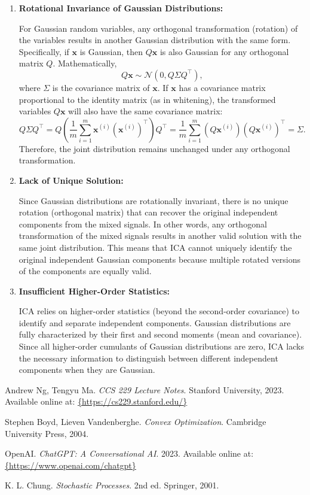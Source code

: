 \documentclass[12pt]{article}
\begin{document}
\begin{enumerate}
    \item \textbf{Rotational Invariance of Gaussian Distributions:}
    
    For Gaussian random variables, any orthogonal transformation (rotation) of the variables results in another Gaussian distribution with the same form. Specifically, if \( \mathbf{x} \) is Gaussian, then \( Q \mathbf{x} \) is also Gaussian for any orthogonal matrix \( Q \). Mathematically,
    \[
    Q \mathbf{x} \sim \mathcal{N}(0, Q \Sigma Q^\top),
    \]
    where \( \Sigma \) is the covariance matrix of \( \mathbf{x} \). If \( \mathbf{x} \) has a covariance matrix proportional to the identity matrix (as in whitening), the transformed variables \( Q \mathbf{x} \) will also have the same covariance matrix:
    \[
    Q \Sigma Q^\top = Q \left( \frac{1}{m} \sum_{i=1}^m \mathbf{x}^{(i)} (\mathbf{x}^{(i)})^\top \right) Q^\top = \frac{1}{m} \sum_{i=1}^m (Q \mathbf{x}^{(i)}) (Q \mathbf{x}^{(i)})^\top = \Sigma.
    \]
    Therefore, the joint distribution remains unchanged under any orthogonal transformation.

    \item \textbf{Lack of Unique Solution:}
    
    Since Gaussian distributions are rotationally invariant, there is no unique rotation (orthogonal matrix) that can recover the original independent components from the mixed signals. In other words, any orthogonal transformation of the mixed signals results in another valid solution with the same joint distribution. This means that ICA cannot uniquely identify the original independent Gaussian components because multiple rotated versions of the components are equally valid.

    \item \textbf{Insufficient Higher-Order Statistics:}
    
    ICA relies on higher-order statistics (beyond the second-order covariance) to identify and separate independent components. Gaussian distributions are fully characterized by their first and second moments (mean and covariance). Since all higher-order cumulants of Gaussian distributions are zero, ICA lacks the necessary information to distinguish between different independent components when they are Gaussian.
\end{enumerate}


\newpage
\begin{thebibliography}{99}

    Andrew Ng, Tengyu Ma. \textit{CCS 229 Lecture Notes}. Stanford University, 2023. Available online at: \url{{https://cs229.stanford.edu/}}
    
    Stephen Boyd, Lieven Vandenberghe. \textit{Convex Optimization}. Cambridge University Press, 2004.
    
    OpenAI. \textit{ChatGPT: A Conversational AI}. 2023. Available online at: \url{{https://www.openai.com/chatgpt}}
    
    K. L. Chung. \textit{Stochastic Processes}. 2nd ed. Springer, 2001.

\end{thebibliography}
\end{document}
